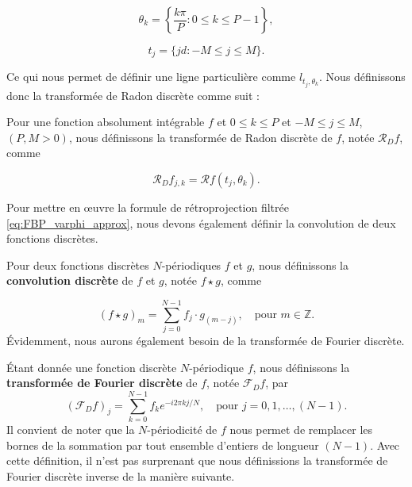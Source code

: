 \begin{equation}
\theta_k = \left\{ \frac{k \pi}{P} : 0 \le k \le P - 1 \right\},
\end{equation}

\begin{equation}
t_j = \{ jd : -M \le j \le M \}.
\end{equation}

Ce qui nous permet de définir une ligne particulière comme \(l_{t_j, \theta_k}\). Nous définissons donc la transformée de Radon discrète comme suit :

\begin{definition}
Pour une fonction absolument intégrable \(f\) et \(0 \le k \le P\) et \(-M \le j \le M\), \((P, M > 0)\), nous définissons la transformée de Radon discrète de \(f\), notée \(\mathcal{R}_D f\), comme

\begin{equation}
\mathcal{R}_D f_{j,k} = \mathcal{R} f(t_j, \theta_k).
\end{equation}

\end{definition}
Pour mettre en œuvre la formule de rétroprojection filtrée \eqref{eq:FBP_varphi_approx}, nous devons également définir la convolution de deux fonctions discrètes.

\begin{definition}
Pour deux fonctions discrètes \(N\)-périodiques \(f\) et \(g\), nous définissons la \textbf{convolution discrète} de \(f\) et \(g\), notée \(f \star g\), comme

\begin{equation}
(f \star g)_m = \sum_{j=0}^{N-1} f_j \cdot g_{(m-j)}, \quad \text{pour } m \in \mathbb{Z}.
\end{equation}
Évidemment, nous aurons également besoin de la transformée de Fourier discrète.
\end{definition}

\begin{definition}
Étant donnée une fonction discrète $N$-périodique $f$, nous définissons la \textbf{transformée de Fourier discrète} de $f$, notée $\mathcal{F}_D f$, par
\begin{equation}
(\mathcal{F}_D f)_j = \sum_{k=0}^{N-1} f_k e^{-i 2 \pi k j / N}, \quad \text{pour } j = 0, 1, \dots, (N-1).
\end{equation}
Il convient de noter que la $N$-périodicité de $f$ nous permet de remplacer les bornes de la sommation par tout ensemble d'entiers de longueur $(N-1)$. Avec cette définition, il n'est pas surprenant que nous définissions la transformée de Fourier discrète inverse de la manière suivante.
\end{definition}

